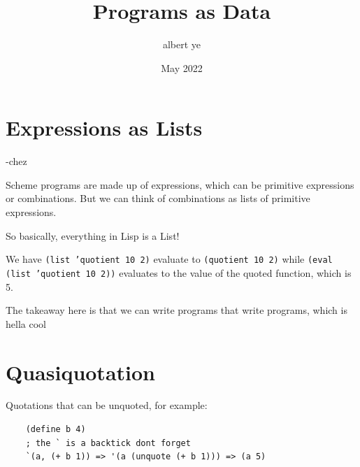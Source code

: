 \documentclass{scrartcl}
\title{Programs as Data}
\author{albert ye}
\date{May 2022}
\begin{document}
\maketitle
\section{Expressions as Lists}
 -chez

Scheme programs are made up of expressions, which can be 
primitive expressions or combinations. But we can think of 
combinations as lists of primitive expressions. 

So basically, everything in Lisp is a List!

We have \texttt{(list 'quotient 10 2)} evaluate to \texttt{(quotient 10 2)}
while \texttt{(eval (list 'quotient 10 2))} evaluates to the value of the
quoted function, which is 5.

The takeaway here is that we can write programs that write programs,
which is hella cool

\section{Quasiquotation}
Quotations that can be unquoted, for example: 

\begin{verbatim}
	(define b 4)
	; the ` is a backtick dont forget
	`(a, (+ b 1)) => '(a (unquote (+ b 1))) => (a 5)
\end{verbatim}
\end{document}
